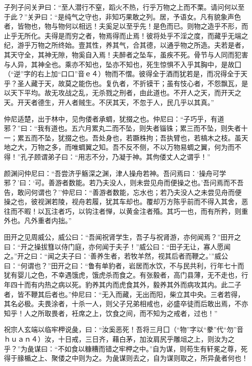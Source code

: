 \documentclass[]{article}
\begin{document}
子列子问关尹曰：``至人潜行不窒，蹈火不热，行乎万物之上而不栗。请问何以至于此？''关尹曰：``是纯气之守也，非知巧果敢之列。居，予语女。凡有貌象声色者，皆物也，物与物何以相远！夫奚足以至乎先！是色而已。则物之造乎不形，而止乎无所化。夫得是而穷之者，物焉得而止焉！彼将处乎不淫之度，而藏乎无端之纪，游乎万物之所终始。壹其性，养其气，合其德，以通乎物之所造。夫若是者，其天守全，其神无隙，物奚自入焉！夫醉者之坠车，虽疾不死。骨节与人同而犯害与人异，其神全也。乘亦不知也，坠亦不知也，死生惊惧不入乎其胸中，是故囗（``逆''字的右上加``口口''音ｅ４）物而不慴。彼得全于酒而犹若是，而况得全于天乎？圣人藏于天，故莫之能伤也。复仇者，不折镆干；虽有忮心者，不怨飘瓦，是以天下平均。故无攻战之乱，无杀戮之刑者，由此道也。不开人之天，而开天之天。开天者德生，开人者贼生。不厌其天，不忽于人，民几乎以其真。''

仲尼适楚，出于林中，见佝偻者承蜩，犹掇之也。仲尼曰：``子巧乎，有道邪？''曰：``我有道也。五六月累丸二而不坠，则失者锱铢；累三而不坠，则失者十一；累五而不坠，犹掇之也。吾处身也，若蹶株拘；吾执臂也，若槁木之枝。虽天地之大，万物之多，而唯蜩翼之知。吾不反不侧，不以万物易蜩之翼，何为而不得！''孔子顾谓弟子曰：``用志不分，乃凝于神。其佝偻丈人之谓乎！''

颜渊问仲尼曰：``吾尝济乎觞深之渊，津人操舟若神。吾问焉曰：`操舟可学邪？'曰：`可。善游者数能。若乃夫没人，则未尝见舟而便操之也。'吾问焉而不吾告，敢问何谓也？''仲尼曰：``善游者数能，忘水也；若乃夫没人之未尝见舟而便操之也，彼视渊若陵，视舟若履，犹其车却也。覆却万方陈乎前而不得入其舍，恶往而不暇！以瓦注者巧，以钩注者惮，以黄金注者殙。其巧一也，而有所矜，则重外也。凡外重者内拙。''

田开之见周威公，威公曰：``吾闻祝肾学生，吾子与祝肾游，亦何闻焉？''田开之曰：``开之操拔篲以侍门庭，亦何闻于夫子！''威公曰：``田子无让，寡人愿闻之。''开之曰：``闻之夫子曰：`善养生者，若牧羊然，视其后者而鞭之。'''威公曰：``何谓也？''田开之曰：``鲁有单豹者，岩居而水饮，不与民共利，行年七十而犹有婴儿之色，不幸遇饿虎，饿虎杀而食之。有张毅者，高门县薄，无不走也，行年四十而有内热之病以死。豹养其内而虎食其外，毅养其外而病攻其内。此二子者，皆不鞭其后者也。''仲尼曰：``无入而藏，无出而阳，柴立其中央。三者若得，其名必极。夫畏涂者，十杀一人，则父子兄弟相戒也，必盛卒徒而后敢出焉，不亦知乎！人之所取畏者，衽席之上，饮食之间，而不知为之戒者，过也！''

祝宗人玄端以临牢柙说彘，曰：``汝奚恶死！吾将三月囗（``物''字以``豢''代``勿''音ｈｕａｎ４）汝，十日戒，三日齐，藉白茅，加汝肩尻乎雕俎之上，则汝为之乎？''为彘谋曰：``不如食以糠糟而错之牢柙之中。''自为谋，则苟生有轩冕之尊，死得于腞楯之上、聚偻之中则为之。为彘谋则去之，自为谋则取之，所异彘者何也！
\end{document}
